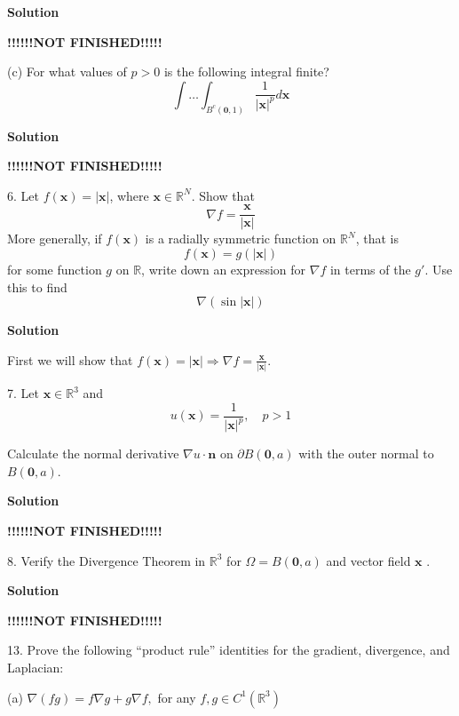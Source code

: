 \documentclass{article}
\begin{document}
\textbf{Solution}

\quad \textbf{!!!!!!NOT FINISHED!!!!!}

\vspace{5mm}
(c) For what values of $p > 0$ is the following integral finite?
\begin{equation}
    \int \ldots \int_{B^{c}(\mathbf{0}, 1)} \frac{1}{|\mathbf{x}|^{p}} d \mathbf{x}
    \label{eq:p2q3c}
\end{equation}

\textbf{Solution}

\quad \textbf{!!!!!!NOT FINISHED!!!!!}

\vspace{5mm}
6. Let $f(\mathbf{x}) = |\mathbf{x}|$, where $\mathbf{x} \in \mathbb{R}^{N}$.
Show that $$\nabla f = \frac{\mathbf{x}}{|\mathbf{x}|}$$ More generally,
if $f(\mathbf{x})$ is a radially symmetric function on $\mathbb{R}^{N}$,
that is $$f(\mathbf{x}) = g(|\mathbf{x}|)$$ for some function $g$ on
$\mathbb{R}$, write down an expression for $\nabla f$ in terms of the $g'$.
Use this to find $$\nabla(\sin |\mathbf{x}|)$$

\textbf{Solution}

First we will show that
$f(\mathbf{x}) = |\mathbf{x}| \Rightarrow \nabla f = \frac{\mathbf{x}}{|\mathbf{x}|}$.

\vspace{5mm}
7. Let $\mathbf{x} \in \mathbb{R}^{3}$ and
$$u(\mathbf{x}) = \frac{1}{|\mathbf{x}|^{p}}, \quad p>1$$

Calculate the normal derivative $\nabla u \cdot \mathbf{n}$ on $\partial
B(\mathbf{0}, a)$ with the outer normal to $B(\mathbf{0}, a)$.

\textbf{Solution}

\quad \textbf{!!!!!!NOT FINISHED!!!!!}

\vspace{5mm}
8. Verify the Divergence Theorem in $\mathbb{R}^{3}$ for
$\Omega = B(\mathbf{0}, a)$ and vector field $\mathbf{x}$ .

\textbf{Solution}

\quad \textbf{!!!!!!NOT FINISHED!!!!!}

\vspace{5mm}
13. Prove the following ``product rule'' identities for the gradient,
divergence, and Laplacian:

(a) $\nabla(f g) = f \nabla g + g \nabla f,$ for any
$f, g \in C^{1}\left(\mathbb{R}^{3}\right)$
\end{document}
